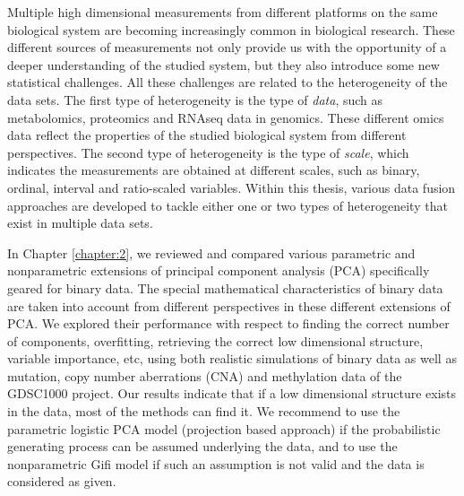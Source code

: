 \summary
Multiple high dimensional measurements from different platforms on the same biological system are becoming increasingly common in biological research. These different sources of measurements not only provide us with the opportunity of a deeper understanding of the studied system, but they also introduce some new statistical challenges. All these challenges are related to the heterogeneity of the data sets. The first type of heterogeneity is the type of \emph{data}, such as metabolomics, proteomics and RNAseq data in genomics. These different omics data reflect the properties of the studied biological system from different perspectives. The second type of heterogeneity is the type of \emph{scale}, which indicates the measurements are obtained at different scales, such as binary, ordinal, interval and ratio-scaled variables. Within this thesis, various data fusion approaches are developed to tackle either one or two types of heterogeneity that exist in multiple data sets.

In Chapter \ref{chapter:2}, we reviewed and compared various parametric and nonparametric extensions of principal component analysis (PCA) specifically geared for binary data. The special mathematical characteristics of binary data are taken into account from different perspectives in these different extensions of PCA. We explored their performance with respect to finding the correct number of components, overfitting, retrieving the correct low dimensional structure, variable importance, etc, using both realistic simulations of binary data as well as mutation, copy number aberrations (CNA) and methylation data of the GDSC1000 project. Our results indicate that if a low dimensional structure exists in the data, most of the methods can find it. We recommend to use the parametric logistic PCA model (projection based approach) if the probabilistic generating process can be assumed underlying the data, and to use the nonparametric Gifi model if such an assumption is not valid and the data is considered as given.

